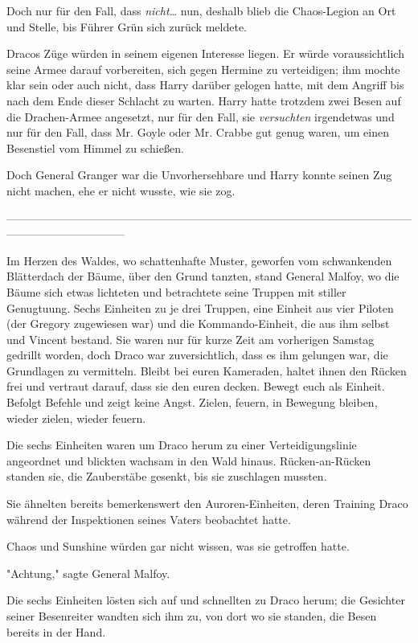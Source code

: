 {Doch nur für den Fall, dass \emph{nicht…} nun, deshalb blieb die Chaos-Legion an Ort und Stelle, bis Führer Grün sich zurück meldete.

Dracos Züge würden in seinem eigenen Interesse liegen. Er würde voraussichtlich seine Armee darauf vorbereiten, sich gegen Hermine zu verteidigen; ihm mochte klar sein oder auch nicht, dass Harry darüber gelogen hatte, mit dem Angriff bis nach dem Ende dieser Schlacht zu warten. Harry hatte trotzdem zwei Besen auf die Drachen-Armee angesetzt, nur für den Fall, sie \emph{versuchten} irgendetwas und nur für den Fall, dass Mr. Goyle oder Mr. Crabbe gut genug waren, um einen Besenstiel vom Himmel zu schießen.

Doch General Granger war die Unvorhersehbare und Harry konnte seinen Zug nicht machen, ehe er nicht wusste, wie sie zog.

--------------------------------------------------------------------------------------------------------------------------------------------

Im Herzen des Waldes, wo schattenhafte Muster, geworfen vom schwankenden Blätterdach der Bäume, über den Grund tanzten, stand General Malfoy, wo die Bäume sich etwas lichteten und betrachtete seine Truppen mit stiller Genugtuung. Sechs Einheiten zu je drei Truppen, eine Einheit aus vier Piloten (der Gregory zugewiesen war) und die Kommando-Einheit, die aus ihm selbst und Vincent bestand. Sie waren nur für kurze Zeit am vorherigen Samstag gedrillt worden, doch Draco war zuversichtlich, dass es ihm gelungen war, die Grundlagen zu vermitteln. Bleibt bei euren Kameraden, haltet ihnen den Rücken frei und vertraut darauf, dass sie den euren decken. Bewegt euch als Einheit. Befolgt Befehle und zeigt keine Angst. Zielen, feuern, in Bewegung bleiben, wieder zielen, wieder feuern.

Die sechs Einheiten waren um Draco herum zu einer Verteidigungslinie angeordnet und blickten wachsam in den Wald hinaus. Rücken-an-Rücken standen sie, die Zauberstäbe gesenkt, bis sie zuschlagen mussten.

Sie ähnelten bereits bemerkenswert den Auroren-Einheiten, deren Training Draco während der Inspektionen seines Vaters beobachtet hatte.

Chaos und Sunshine würden gar nicht wissen, was sie getroffen hatte.

"Achtung," sagte General Malfoy.

Die sechs Einheiten lösten sich auf und schnellten zu Draco herum; die Gesichter seiner Besenreiter wandten sich ihm zu, von dort wo sie standen, die Besen bereits in der Hand.

}
